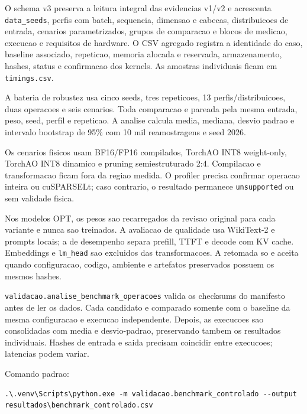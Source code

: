 O schema v3 preserva a leitura integral das evidencias v1/v2 e acrescenta
\texttt{data\_seeds}, perfis com batch, sequencia, dimensao e cabecas,
distribuicoes de entrada, cenarios parametrizados, grupos de comparacao e blocos
de medicao, execucao e requisitos de hardware. O CSV agregado registra a
identidade do caso, baseline associado, repeticao, memoria alocada e reservada,
armazenamento, hashes, status e confirmacao dos kernels. As amostras individuais
ficam em \texttt{timings.csv}.

A bateria de robustez usa cinco seeds, tres repeticoes, 13 perfis/distribuicoes,
duas operacoes e seis cenarios. Toda comparacao e pareada pela mesma entrada,
peso, seed, perfil e repeticao. A analise calcula media, mediana, desvio padrao e
intervalo bootstrap de 95\% com 10 mil reamostragens e seed 2026.

Os cenarios fisicos usam BF16/FP16 compilados, TorchAO INT8 weight-only,
TorchAO INT8 dinamico e pruning semiestruturado 2:4. Compilacao e transformacao
ficam fora da regiao medida. O profiler precisa confirmar operacao inteira ou
cuSPARSELt; caso contrario, o resultado permanece \texttt{unsupported} ou sem
validade fisica.

Nos modelos OPT, os pesos sao recarregados da revisao original para cada
variante e nunca sao treinados. A avaliacao de qualidade usa WikiText-2 e
prompts locais; a de desempenho separa prefill, TTFT e decode com KV cache.
Embeddings e \texttt{lm\_head} sao excluidos das transformacoes. A retomada so
e aceita quando configuracao, codigo, ambiente e artefatos preservados possuem
os mesmos hashes.







\texttt{validacao.\allowbreak{}analise\_\allowbreak{}benchmark\_\allowbreak{}operacoes} valida os checksums do manifesto antes de ler os dados. Cada candidato e comparado somente com o baseline da mesma configuracao e execucao independente. Depois, as execucoes sao consolidadas com media e desvio-padrao, preservando tambem os resultados individuais. Hashes de entrada e saida precisam coincidir entre execucoes; latencias podem variar.



Comando padrao:



\begin{Verbatim}[fontsize=\small,breaklines=true,label=powershell]
.\.venv\Scripts\python.exe -m validacao.benchmark_controlado --output resultados\benchmark_controlado.csv
\end{Verbatim}




